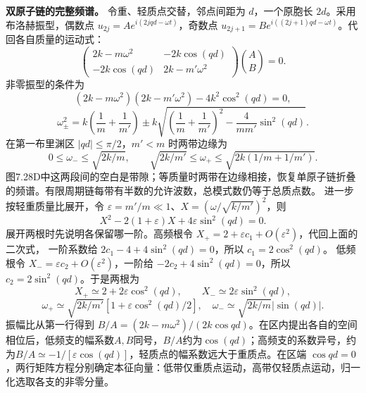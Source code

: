 \documentclass[UTF8,fontset=fandol,a4paper,11pt]{ctexart}
\newcommand{\figcaption}[1]{\par\vspace{2pt}{\small\color{muted}#1}\par}
\begin{document}
\begin{center}\begin{minipage}{\linewidth}\centering{}\figcaption{解图 7.28D}\end{minipage}\end{center}
\par\textbf{双原子链的完整频谱。} 令重、轻质点交替，邻点间距为 $d$，一个原胞长 $2d$。采用布洛赫振型，偶数点 $u_{2j}=A e^{i(2jqd-\omega t)}$，奇数点 $u_{2j+1}=B e^{i((2j+1)qd-\omega t)}$。代回各自质量的运动式：
\[\begin{pmatrix}2k-m\omega^2&-2k\cos(qd)\\
-2k\cos(qd)&2k-m'\omega^2\end{pmatrix}\binom AB=0.\]
非零振型的条件为
\[(2k-m\omega^2)(2k-m'\omega^2)-4k^2\cos^2(qd)=0,\]
\[\boxed{\omega_\pm^2=k\left(\frac1m+\frac1{m'}\right)
\pm k\sqrt{\left(\frac1m+\frac1{m'}\right)^2
-\frac4{mm'}\sin^2(qd)}.}\]
在第一布里渊区 $|qd|\le\pi/2$，$m'<m$ 时两带边缘为
\[0\le\omega_-\le\sqrt{2k/m},\qquad
\sqrt{2k/m'}\le\omega_+\le\sqrt{2k(1/m+1/m')}.\]
图7.28D中这两段间的空白是带隙；等质量时两带在边缘相接，恢复单原子链折叠的频谱。有限周期链每带有半数的允许波数，总模式数仍等于总质点数。
进一步按轻重质量比展开，令 $\varepsilon=m'/m\ll1$、$X=(\omega/\sqrt{k/m'})^2$，则
\[X^2-2(1+\varepsilon)X+4\varepsilon\sin^2(qd)=0.\]
展开两根时先说明各保留哪一阶。高频根令
$X_+=2+\varepsilon c_1+O(\varepsilon^2)$，代回上面的二次式，
一阶系数给 $2c_1-4+4\sin^2(qd)=0$，所以 $c_1=2\cos^2(qd)$。
低频根令 $X_-=\varepsilon c_2+O(\varepsilon^2)$，一阶给
$-2c_2+4\sin^2(qd)=0$，所以 $c_2=2\sin^2(qd)$。于是两根为
\[X_+\simeq2+2\varepsilon\cos^2(qd),\qquad
X_-\simeq2\varepsilon\sin^2(qd),\]
\[\omega_+\simeq\sqrt{2k/m'}[1+\varepsilon\cos^2(qd)/2],
\quad\omega_-\simeq\sqrt{2k/m}|\sin(qd)|.\]
振幅比从第一行得到 $B/A=(2k-m\omega^2)/(2k\cos qd)$。在区内提出各自的空间相位后，低频支的幅系数$A,B$同号，$B/A$约为$\cos(qd)$；高频支的系数异号，约为$B/A\simeq-1/[\varepsilon\cos(qd)]$，轻质点的幅系数远大于重质点。在区端 $\cos qd=0$，两行矩阵方程分别确定本征向量：低带仅重质点运动，高带仅轻质点运动，归一化选取各支的非零分量。
\end{document}
